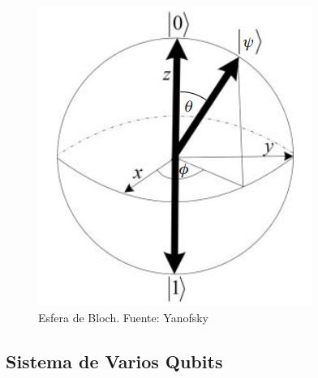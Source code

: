 \documentclass[a4paper]{article}
\numberwithin{equation}{section}
\begin{document}
\begin{figure}[h]
	\centering
	\includegraphics[scale=0.7]{esfera_bloch}
	\caption{Esfera de Bloch. Fuente: Yanofsky \cite{yanofsky2008quantum}}
\end{figure}


\subsection{Sistema de Varios Qubits}
\end{document}
